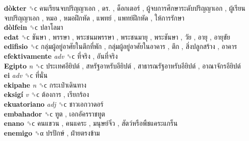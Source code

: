 \textbf{dòkter} ␝ϲ   คนเรียนจบปริญญาเอก ,  ดร. ,  ด็อกเตอร์ ,  ผู้จบการศึกษาระดับปริญญาเอก ,  ผู้เรียนจบปริญญาเอก ,  หมอ ,  หมอฝึกหัด ,  แพทย์ ,  แพทย์ฝึกหัด ,  ให้การรักษา   \\
\textbf{dòlfein} ␝ϲ   ปลาโลมา   \\
\textbf{edat} ␝ϲ   ชันษา ,  พรรษา ,  พระชนมพรรษา ,  พระชนมายุ ,  พระชันษา ,  วัย ,  อายุ ,  อายุขัย   \\
\textbf{edifisio} ␝ϲ   กลุ่มผู้อยู่อาศัยในตึกที่พัก ,  กลุ่มผู้อยู่อาศัยในอาคาร ,  ตึก ,  สิ่งปลูกสร้าง ,  อาคาร   \\
\textbf{efektivamente} \emph{adv}  ␝ϲ   ที่จริง ,  อันที่จริง   \\
\textbf{Egipto} \emph{n}  ␝ϲ   ประเทศอียิปต์ ,  สหรัฐอาหรับอียิปต์ ,  สาธารณรัฐอาหรับอียิปต์ ,  อาณาจักรอียิปต์   \\
\textbf{ei} \emph{adv}  ␝ϲ   ที่นั่น   \\
\textbf{ekipahe} \emph{n}  ␝ϲ   กระเป๋าเดินทาง   \\
\textbf{eksigí} \emph{v}  ␝ϲ   ต้องการ ,  เรียกร้อง   \\
\textbf{ekuatoriano} \emph{adj}  ␝ϲ   ชาวเอกวาดอร์   \\
\textbf{embahador} ␝ϲ   ทูต ,  เอกอัครราชทูต   \\
\textbf{enano} ␝ϲ   คนแขวน ,  คนแคระ ,  มนุษย์จิ๋ว ,  สัตว์หรือพืชแคระแกร็น   \\
\textbf{enemigo} ␝α   ปรปักษ์ ,  ฝ่ายตรงข้าม   \\

